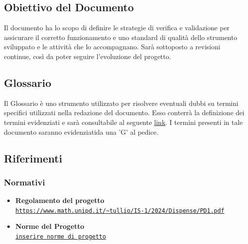 \documentclass{article}
\begin{document}
\subsection{Obiettivo del Documento}
Il documento ha lo scopo di definire le strategie di verifica e validazione per assicurare il corretto funzionamento e uno standard di qualità
dello strumento sviluppato e le attività che lo accompagnano. Sarà sottoposto a revisioni continue, così da poter seguire l'evoluzione del progetto.

\subsection{Glossario}
Il Glossario è uno strumento utilizzato per risolvere eventuali dubbi su termini specifici utilizzati nella redazione del documento. Esso conterrà la definizione dei 
termini evidenziati e sarà consultabile al seguente \href{https://code7crusaders.github.io/docs/RTB/documentazione_interna/glossario.html}{link}. I termini presenti in tale documento
saranno evidenziatida una 'G' al pedice.

\subsection{Riferimenti}
\subsubsection{Normativi}
\begin{itemize}
    \item \textbf{Regolamento del progetto} \\ \texttt{\url{https://www.math.unipd.it/~tullio/IS-1/2024/Dispense/PD1.pdf}}
    \item \textbf{{Norme del Progetto}} \\ \texttt{\url{inserire norme di progetto}}
\end{itemize}
\end{document}
